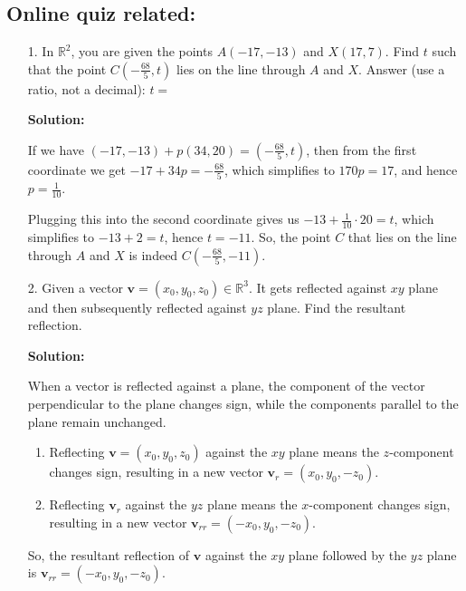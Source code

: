 \documentclass{article}
\begin{document}
\subsection{Online quiz related:}



\begin{enumerate}
  \item[1.]  In $\mathbb{R}^2$, you are given the points $A(-17,-13)$ and $X(17,7)$. Find $t$ such that the point $C\left(-\frac{68}{5}, t\right)$ lies on the line through $A$ and $X$. Answer (use a ratio, not a decimal): $t=$

\textbf{Solution:} 

If we have $(-17,-13)+p(34,20)=\left(-\frac{68}{5}, t\right)$, then from the first coordinate we get $-17+34 p=-\frac{68}{5}$, which simplifies to $170 p=17$, and hence $p=\frac{1}{10}$.

Plugging this into the second coordinate gives us $-13+\frac{1}{10} \cdot 20=t$, which simplifies to $-13+2=t$, hence $t=-11$.
So, the point $C$ that lies on the line through $A$ and $X$ is indeed $C\left(-\frac{68}{5},-11\right)$.
  \item[2.] Given a vector $\mathbf{v}=(x_{0}, y_{0}, z_{0})\in \mathbb{R}^3$. It gets reflected against $xy$ plane and then subsequently reflected against $yz$ plane. Find the resultant reflection. 

  \textbf{Solution:}

  When a vector is reflected against a plane, the component of the vector perpendicular to the plane changes sign, while the components parallel to the plane remain unchanged.
\begin{enumerate}
  \item  Reflecting $\mathbf{v}=\left(x_0, y_0, z_0\right)$ against the $x y$ plane means the $z$-component changes sign, resulting in a new vector $\mathbf{v}_r=\left(x_0, y_0,-z_0\right)$.
  \item Reflecting $\mathbf{v}_r$ against the $y z$ plane means the $x$-component changes sign, resulting in a new vector $\mathbf{v}_{rr}=\left(-x_0, y_0,-z_0\right)$.

\end{enumerate}
 
  So, the resultant reflection of $\mathbf{v}$ against the $x y$ plane followed by the $y z$ plane is $\mathbf{v}_{rr}=\left(-x_0, y_0,-z_0\right)$.

\end{enumerate}
\end{document}
